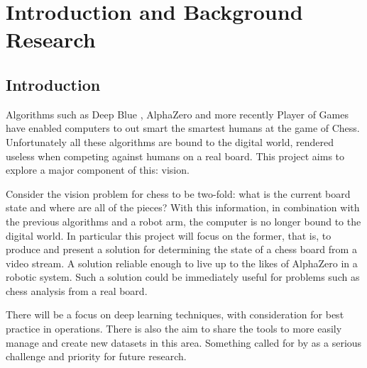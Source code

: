 \chapter{Introduction and Background Research}

\label{chapter1}

\section{Introduction}

Algorithms such as Deep Blue \cite{parikh1980adaptive}, AlphaZero \cite{} and more recently Player of Games\cite{}
have enabled computers to out smart the smartest humans at the game of Chess.
Unfortunately all these algorithms are bound to the digital world, rendered useless when
competing against humans on a real board. This project aims to explore a major
component of this: vision.

Consider the vision problem for chess to be two-fold: what is the current board
state and where are all of the pieces?  With this information, in combination with the
previous algorithms and a robot arm, the computer is no longer bound to the
digital world. In particular this project will focus on the former, that is, to produce and present a solution for determining the
state of a chess board from a video stream.  A solution reliable enough to live up to the likes of AlphaZero 
in a robotic system.  Such a solution could be immediately useful for problems such as chess analysis from a real board.

There will be a focus on deep learning techniques, with consideration for best practice in operations.  There is also the aim to share the 
tools to more easily manage and create new datasets in this area.  Something 
called for by \cite{} as a serious challenge and priority for future research.

